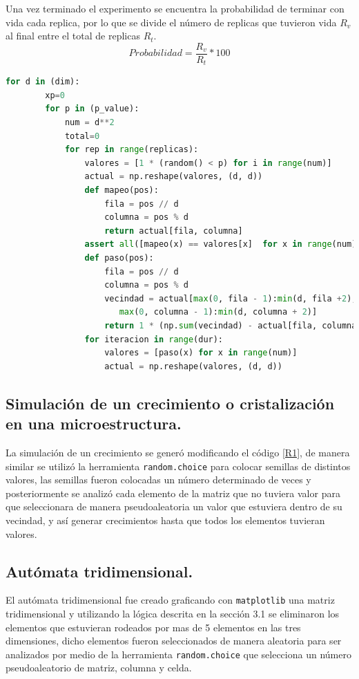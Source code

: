 \documentclass{article}
\begin{document}
Una vez terminado el experimento se encuentra la probabilidad de terminar con vida cada replica, por lo que se divide el número de replicas que tuvieron vida $R_v$al final entre el total de replicas $R_t$.
\begin{equation}
    Probabilidad=\frac{R_v}{R_t}*100
\end{equation}
\lstset{basicstyle=\ttfamily, keywordstyle=\bfseries}
\begin{lstlisting}[frame=single,language=Python,caption=Programación de un autómata celular variando el valor de $p$ y $num$\label{R1}]
  for d in (dim):
        xp=0
        for p in (p_value):
            num = d**2
            total=0
            for rep in range(replicas):
                valores = [1 * (random() < p) for i in range(num)]
                actual = np.reshape(valores, (d, d))
                def mapeo(pos):  
                    fila = pos // d
                    columna = pos % d
                    return actual[fila, columna]
                assert all([mapeo(x) == valores[x]  for x in range(num)])
                def paso(pos):
                    fila = pos // d
                    columna = pos % d
                    vecindad = actual[max(0, fila - 1):min(d, fila +2),
                       max(0, columna - 1):min(d, columna + 2)]
                    return 1 * (np.sum(vecindad) - actual[fila, columna] == 3)
                for iteracion in range(dur):
                    valores = [paso(x) for x in range(num)]
                    actual = np.reshape(valores, (d, d))
\end{lstlisting}  
\subsection{Simulación de un crecimiento o cristalización en una microestructura.}
La simulación de un crecimiento se generó modificando el código \ref{R1}, de manera similar se utilizó la herramienta \texttt{random.choice} para colocar semillas de distintos valores, las semillas fueron colocadas un número determinado de veces y posteriormente se analizó cada elemento de la matriz que no tuviera valor para que seleccionara de manera pseudoaleatoria un valor que estuviera dentro de su vecindad, y así generar crecimientos hasta que todos los elementos tuvieran valores.
\subsection{Autómata tridimensional.}
El autómata tridimensional fue creado graficando con \texttt{matplotlib} una matriz tridimensional y utilizando la lógica descrita en la sección 3.1 se eliminaron los elementos que estuvieran rodeados por mas de 5 elementos en las tres dimensiones, dicho elementos fueron seleccionados de manera aleatoria para ser analizados por medio de la herramienta \texttt{random.choice} que selecciona un número pseudoaleatorio de matriz, columna y celda.
\end{document}
